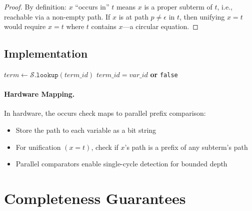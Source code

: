 \documentclass[11pt,a4paper]{article}
\begin{document}
\begin{proof}
By definition: $x$ ``occurs in'' $t$ means $x$ is a proper subterm of $t$, i.e.,
reachable via a non-empty path.
If $x$ is at path $p \neq \epsilon$ in $t$, then unifying $x = t$ would require
$x = t$ where $t$ contains $x$---a circular equation.
\end{proof}

\subsection{Implementation}

\begin{algorithm}[ht]
\caption{Occurs Check via Path Traversal}
\label{alg:occurs_check_chirho}
\begin{algorithmic}[1]
  \State $term \gets \mathcal{S}.\texttt{lookup}(term\_id)$
    \State \Return $term\_id = var\_id$
    \State \Return {} \textbf{or}
    \State \hspace{2em} 
  \Else
    \State \Return \texttt{false} 
  \EndIf
\EndFunction
\end{algorithmic}
\end{algorithm}

\paragraph{Hardware Mapping.}
In hardware, the occurs check maps to parallel prefix comparison:
\begin{itemize}
  \item Store the path to each variable as a bit string
  \item For unification $(x = t)$, check if $x$'s path is a prefix of any subterm's path
  \item Parallel comparators enable single-cycle detection for bounded depth
\end{itemize}

\section{Completeness Guarantees}
\label{sec:completeness_chirho}
\end{document}
